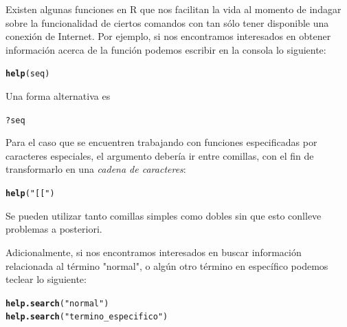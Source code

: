 \documentclass[11pt,a4paper,oneside]{book}\usepackage[]{graphicx}\usepackage[]{color}
\makeatletter
\newcommand{\hlstr}[1]{\textcolor[rgb]{0.192,0.494,0.8}{#1}}%
\newcommand{\hlopt}[1]{\textcolor[rgb]{0,0,0}{#1}}%
\newcommand{\hlstd}[1]{\textcolor[rgb]{0.345,0.345,0.345}{#1}}%
\newcommand{\hlkwd}[1]{\textcolor[rgb]{0.737,0.353,0.396}{\textbf{#1}}}%
\newenvironment{kframe}{%
 \def\at@end@of@kframe{}%
 \ifinner\ifhmode%
  \def\at@end@of@kframe{\end{minipage}}%
  \begin{minipage}{\columnwidth}%
 \fi\fi%
 \def\FrameCommand##1{\hskip\@totalleftmargin \hskip-\fboxsep
 \colorbox{shadecolor}{##1}\hskip-\fboxsep
     \hskip-\linewidth \hskip-\@totalleftmargin \hskip\columnwidth}%
 \MakeFramed {\advance\hsize-\width
   \@totalleftmargin\z@ \linewidth\hsize
   \@setminipage}}%
 {\par\unskip\endMakeFramed%
 \at@end@of@kframe}
\newenvironment{knitrout}{}{} %
\newcommand{\code}[1]{\fcolorbox{white}{gray!15}{#1}}
\makeatother
\begin{document}
\begin{itemize}
Existen algunas funciones en R que nos facilitan la vida al momento de indagar sobre la funcionalidad de ciertos comandos con tan sólo tener disponible una conexión de Internet. Por ejemplo, si nos encontramos interesados en obtener información acerca de la función \code{\texttt{seq()}} podemos escribir en la consola lo siguiente:
\begin{knitrout}
\color{fgcolor}\begin{kframe}
\begin{alltt}
\hlkwd{help}\hlstd{(seq)}
\end{alltt}
\end{kframe}
\end{knitrout}
Una forma alternativa es
\begin{knitrout}
\color{fgcolor}\begin{kframe}
\begin{alltt}
\hlopt{?}\hlstd{seq}
\end{alltt}
\end{kframe}
\end{knitrout}
Para el caso que se encuentren trabajando con funciones especificadas por caracteres especiales, el argumento debería ir entre comillas, con el fin de transformarlo en una \emph{cadena de caracteres}:
\begin{knitrout}
\color{fgcolor}\begin{kframe}
\begin{alltt}
\hlkwd{help}\hlstd{(}\hlstr{"[["}\hlstd{)}
\end{alltt}
\end{kframe}
\end{knitrout}
Se pueden utilizar tanto comillas simples como dobles sin que esto conlleve problemas a posteriori.\newline

Adicionalmente, si nos encontramos interesados en buscar información relacionada al término "normal", o algún otro término en específico podemos teclear lo siguiente:
\begin{knitrout}
\color{fgcolor}\begin{kframe}
\begin{alltt}
\hlkwd{help.search}\hlstd{(}\hlstr{"normal"}\hlstd{)}
\hlkwd{help.search}\hlstd{(}\hlstr{"termino_especifico"}\hlstd{)}
\end{alltt}
\end{kframe}
\end{knitrout}


\end{itemize}
\end{document}
